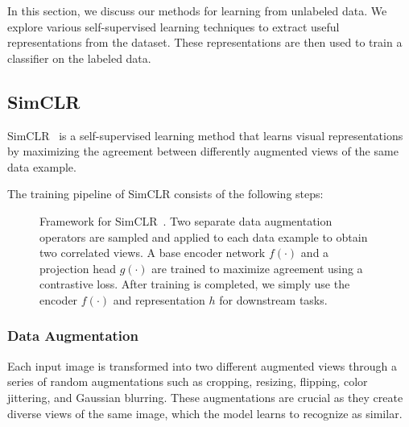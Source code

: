 \documentclass{article}
\begin{document}
In this section, we discuss our methods for learning from unlabeled data. We
explore various self-supervised learning techniques to extract useful
representations from the dataset. These representations are then used to train
a classifier on the labeled data.

\subsection{SimCLR}
SimCLR~\cite{simclr} is a self-supervised learning method that learns visual
representations by maximizing the agreement between differently augmented views
of the same data example.

The training pipeline of SimCLR consists of the following steps:

\begin{figure}[!t]
  \small
  \centering
  \caption{Framework for SimCLR~\cite{simclr}.
    Two separate data augmentation operators are sampled and applied to each data example to obtain two correlated views.
    A base encoder network $f(\cdot)$ and a projection head $g(\cdot)$ are trained to maximize agreement using a contrastive loss.
    After training is completed, we simply use the encoder $f(\cdot)$ and representation $ h$ for downstream tasks.}\label{fig:framework}
\end{figure}

\subsubsection{Data Augmentation}
Each input image is transformed into two different augmented views through a
series of random augmentations such as cropping, resizing, flipping, color
jittering, and Gaussian blurring. These augmentations are crucial as they
create diverse views of the same image, which the model learns to recognize as
similar.
\end{document}
